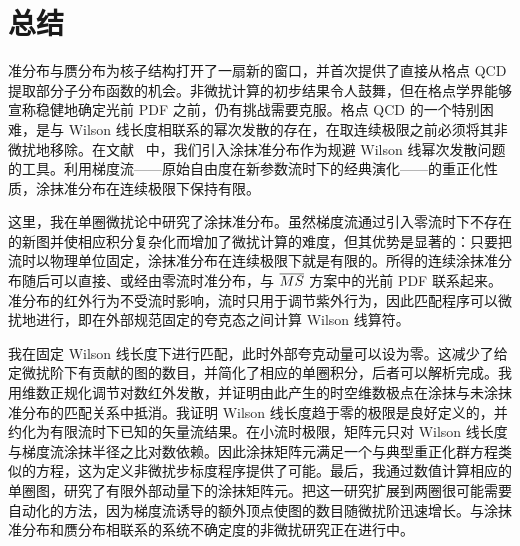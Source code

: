 \section{\label{sec:summary}总结}

准分布与赝分布为核子结构打开了一扇新的窗口，并首次提供了直接从格点 QCD 提取部分子分布函数的机会。非微扰计算的初步结果令人鼓舞，但在格点学界能够宣称稳健地确定光前 PDF 之前，仍有挑战需要克服。格点 QCD 的一个特别困难，是与 Wilson 线长度相联系的幂次发散的存在，在取连续极限之前必须将其非微扰地移除。在文献~\cite{Monahan:2016bvm} 中，我们引入涂抹准分布作为规避 Wilson 线幂次发散问题的工具。利用梯度流——原始自由度在新参数流时下的经典演化——的重正化性质，涂抹准分布在连续极限下保持有限。

这里，我在单圈微扰论中研究了涂抹准分布。虽然梯度流通过引入零流时下不存在的新图并使相应积分复杂化而增加了微扰计算的难度，但其优势是显著的：只要把流时以物理单位固定，涂抹准分布在连续极限下就是有限的。所得的连续涂抹准分布随后可以直接、或经由零流时准分布，与 $\overline{MS}$ 方案中的光前 PDF 联系起来。准分布的红外行为不受流时影响，流时只用于调节紫外行为，因此匹配程序可以微扰地进行，即在外部规范固定的夸克态之间计算 Wilson 线算符。

我在固定 Wilson 线长度下进行匹配，此时外部夸克动量可以设为零。这减少了给定微扰阶下有贡献的图的数目，并简化了相应的单圈积分，后者可以解析完成。我用维数正规化调节对数红外发散，并证明由此产生的时空维数极点在涂抹与未涂抹准分布的匹配关系中抵消。我证明 Wilson 线长度趋于零的极限是良好定义的，并约化为有限流时下已知的矢量流结果。在小流时极限，矩阵元只对 Wilson 线长度与梯度流涂抹半径之比对数依赖。因此涂抹矩阵元满足一个与典型重正化群方程类似的方程，这为定义非微扰步标度程序提供了可能。最后，我通过数值计算相应的单圈图，研究了有限外部动量下的涂抹矩阵元。把这一研究扩展到两圈很可能需要自动化的方法，因为梯度流诱导的额外顶点使图的数目随微扰阶迅速增长。与涂抹准分布和赝分布相联系的系统不确定度的非微扰研究正在进行中。
